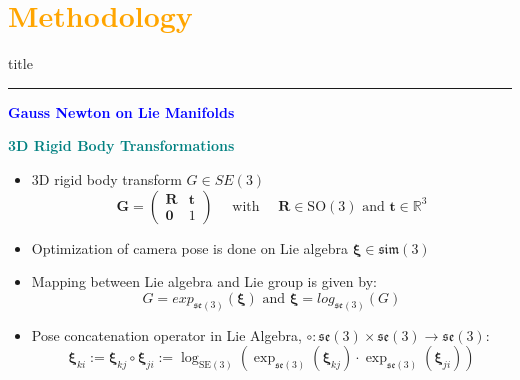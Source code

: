 \documentclass[aspectratio=169]{beamer}
\begin{document}
\section*{\textbf{\textcolor{orange}{Methodology}}}
		\begin{frame}[plain]
				\vfill
			\centering
			\begin{beamercolorbox}[sep=8pt,center,shadow=true,rounded=true]{title}
				\insertsectionhead\par%
				\color{oxfordblue}\noindent\rule{10cm}{1pt}
			\end{beamercolorbox}
			\vfill
	\end{frame}


\begin{frame}{\textcolor{blue}{\textbf{Gauss Newton on Lie Manifolds}}}
	\vspace{-0.5cm}
	\begin{block}{\textbf{\textcolor{teal}{3D Rigid Body Transformations}}}
	\begin{itemize}
			\item 3D rigid body transform $G \in {SE}(3)$
			$$
				\mathbf{G}=\left(\begin{array}{cc}
				\mathbf{R} & \mathbf{t} \\
				\mathbf{0} & 1
				\end{array}\right) \quad \text { with } \quad \mathbf{R} \in \mathrm{SO}(3) \text { and } \mathbf{t} \in \mathbb{R}^3
			$$
			\item Optimization of camera pose is done on Lie algebra $\boldsymbol{\xi} \in \mathfrak{s i m}(3)$
			\item Mapping between Lie algebra and Lie group is given by:
			$$
				G = exp_{\mathfrak{se}(3)}(\boldsymbol{\xi}) \text{ and } \boldsymbol{\xi} = log_{\mathfrak{se}(3)}(G)
			$$
			\item Pose concatenation operator in Lie Algebra, $\circ : \mathfrak{s e}(3) \times \mathfrak{s e}(3) \rightarrow \mathfrak{s e}(3)$: 
			$$
				\boldsymbol{\xi}_{k i}:=\boldsymbol{\xi}_{k j} \circ \boldsymbol{\xi}_{j i}:=\log _{\mathrm{SE}(3)}\left(\operatorname{exp}_{\mathfrak{s e}(3)}\left(\boldsymbol{\xi}_{k j}\right) \cdot \operatorname{exp}_{\mathfrak{se}(3)}\left(\boldsymbol{\xi}_{j i}\right)\right)
			$$

	\end{itemize}

	\end{block}

\end{frame}
\end{document}
